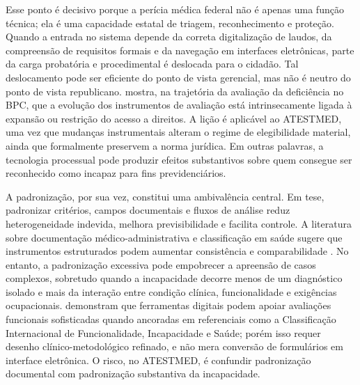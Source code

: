 \documentclass[12pt,a4paper]{article}
\begin{document}
Esse ponto é decisivo porque a perícia médica federal não é apenas uma função técnica; ela é uma capacidade estatal de triagem, reconhecimento e proteção. Quando a entrada no sistema depende da correta digitalização de laudos, da compreensão de requisitos formais e da navegação em interfaces eletrônicas, parte da carga probatória e procedimental é deslocada para o cidadão. Tal deslocamento pode ser eficiente do ponto de vista gerencial, mas não é neutro do ponto de vista republicano. \textcite{nogueira20200731t0100000100aavaliacaodadeficiencianatraje} mostra, na trajetória da avaliação da deficiência no BPC, que a evolução dos instrumentos de avaliação está intrinsecamente ligada à expansão ou restrição do acesso a direitos. A lição é aplicável ao ATESTMED, uma vez que mudanças instrumentais alteram o regime de elegibilidade material, ainda que formalmente preservem a norma jurídica. Em outras palavras, a tecnologia processual pode produzir efeitos substantivos sobre quem consegue ser reconhecido como incapaz para fins previdenciários.

A padronização, por sua vez, constitui uma ambivalência central. Em tese, padronizar critérios, campos documentais e fluxos de análise reduz heterogeneidade indevida, melhora previsibilidade e facilita controle. A literatura sobre documentação médico-administrativa e classificação em saúde sugere que instrumentos estruturados podem aumentar consistência e comparabilidade \parencite{feudtner2014pediatriccomplexchronicconditionsclassificationsyst,sa2020medicalcertificateofdisabilityadescriptiveanalysisofav}. No entanto, a padronização excessiva pode empobrecer a apreensão de casos complexos, sobretudo quando a incapacidade decorre menos de um diagnóstico isolado e mais da interação entre condição clínica, funcionalidade e exigências ocupacionais. \textcite{guo2017assessmentofaphasiaacrosstheinternationalclassification} demonstram que ferramentas digitais podem apoiar avaliações funcionais sofisticadas quando ancoradas em referenciais como a Classificação Internacional de Funcionalidade, Incapacidade e Saúde; porém isso requer desenho clínico-metodológico refinado, e não mera conversão de formulários em interface eletrônica. O risco, no ATESTMED, é confundir padronização documental com padronização substantiva da incapacidade.
\end{document}
